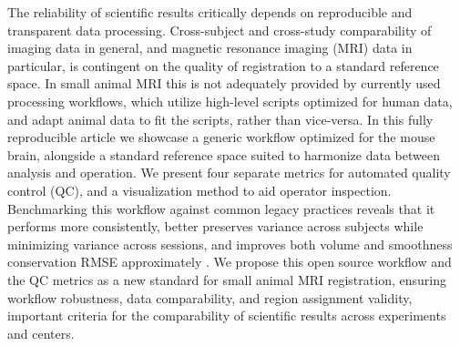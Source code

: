 The reliability of scientific results critically depends on reproducible and transparent data processing.
Cross-subject and cross-study comparability of imaging data in general, and magnetic resonance imaging (MRI) data in particular, is contingent on the quality of registration to a standard reference space.
In small animal MRI this is not adequately provided by currently used processing workflows, which utilize high-level scripts optimized for human data, and adapt animal data to fit the scripts, rather than vice-versa.
In this fully reproducible article we showcase a generic workflow optimized for the mouse brain, alongside a standard reference space suited to harmonize data between analysis and operation.
We present four separate metrics for automated quality control (QC), and a visualization method to aid operator inspection.
Benchmarking this workflow against common legacy practices reveals that it performs more consistently, better preserves variance across subjects while minimizing variance across sessions, and improves both volume and smoothness conservation RMSE approximately
.
We propose this open source workflow and the QC metrics as a new standard for small animal MRI registration, ensuring workflow robustness, data comparability, and region assignment validity, important criteria for the comparability of scientific results across experiments and centers.
